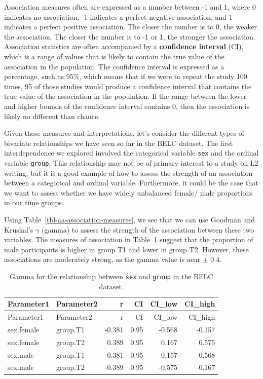 \documentclass[
  letterpaper,
  DIV=11,
  numbers=noendperiod]{scrreport}
\theoremstyle{definition}
\theoremstyle{remark}
\begin{document}
Association measures often are expressed as a number between -1 and 1,
where 0 indicates no association, -1 indicates a perfect negative
association, and 1 indicates a perfect positive association. The closer
the number is to 0, the weaker the association. The closer the number is
to -1 or 1, the stronger the association. Association statistics are
often accompanied by a \textbf{confidence interval} (CI), which is a
range of values that is likely to contain the true value of the
association in the population. The confidence interval is expressed as a
percentage, such as 95\%, which means that if we were to repeat the
study 100 times, 95 of those studies would produce a confidence interval
that contains the true value of the association in the population. If
the range between the lower and higher bounds of the confidence interval
contains 0, then the association is likely no different than chance.

Given these measures and interpretations, let's consider the different
types of bivariate relationships we have seen so far in the BELC
dataset. The first interdependence we explored involved the categorical
variable \texttt{sex} and the ordinal variable \texttt{group}. This
relationship may not be of primary interest to a study on L2 writing,
but it is a good example of how to assess the strength of an association
between a categorical and ordinal variable. Furthermore, it could be the
case that we want to assess whether we have widely unbalanced female/
male proportions in our time groups.

Using Table~\ref{tbl-aa-association-measures}, we see that we can use
Goodman and Kruskal's \(\gamma\) (gamma) to assess the strength of the
association between these two variables. The measures of association in
Table~\ref{tbl-aa-gamma} suggest that the proportion of male
participants is higher in group T1 and lower in group T2. However, these
associations are moderately strong, as the gamma value is near \(\pm\)
0.4.

\hypertarget{tbl-aa-gamma}{}
\begin{longtable}[]{@{}llrrrr@{}}
\caption{\label{tbl-aa-gamma}Gamma for the relationship between
\texttt{sex} and \texttt{group} in the BELC dataset.}\tabularnewline
\toprule\noalign{}
Parameter1 & Parameter2 & r & CI & CI\_low & CI\_high \\
\midrule\noalign{}
\endfirsthead
\toprule\noalign{}
Parameter1 & Parameter2 & r & CI & CI\_low & CI\_high \\
\midrule\noalign{}
\endhead
\bottomrule\noalign{}
\endlastfoot
sex.female & group.T1 & -0.381 & 0.95 & -0.568 & -0.157 \\
sex.female & group.T2 & 0.389 & 0.95 & 0.167 & 0.575 \\
sex.male & group.T1 & 0.381 & 0.95 & 0.157 & 0.568 \\
sex.male & group.T2 & -0.389 & 0.95 & -0.575 & -0.167 \\
\end{longtable}
\end{document}

